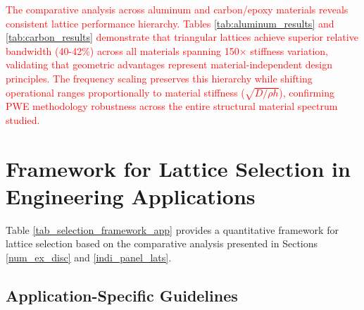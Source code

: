 \documentclass[review,numbers,sort&compress]{elsarticle}
\begin{document}
\textcolor{red}{The comparative analysis across aluminum and carbon/epoxy materials reveals consistent lattice performance hierarchy. Tables \ref{tab:aluminum_results} and \ref{tab:carbon_results} demonstrate that triangular lattices achieve superior relative bandwidth (40-42\%) across all materials spanning 150× stiffness variation, validating that geometric advantages represent material-independent design principles. The frequency scaling preserves this hierarchy while shifting operational ranges proportionally to material stiffness ($\sqrt{D/\rho h}$), confirming PWE methodology robustness across the entire structural material spectrum studied.}

\newpage
\section{Framework for Lattice Selection in Engineering Applications}\label{selection_framework_appendix}

Table \ref{tab_selection_framework_app} provides a quantitative framework for lattice selection based on the comparative analysis presented in Sections \ref{num_ex_disc} and \ref{indi_panel_lats}.

\begin{table}[htb]
    \centering
    \caption{Lattice selection framework for engineering applications.}
    \small
    \label{tab_selection_framework_app}
\end{table}

\subsection{Application-Specific Guidelines}
\end{document}
